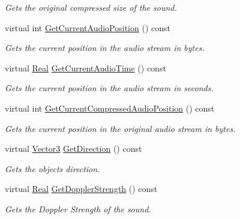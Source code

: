 \begin{DoxyCompactItemize}
\begin{DoxyCompactList}\small\item\em Gets the original compressed size of the sound. \item\end{DoxyCompactList}\item 
virtual int \hyperlink{classMezzanine_1_1Audio_1_1Sound_abba56b18b9bb7b65cc712b4093e87ab5}{GetCurrentAudioPosition} () const 
\begin{DoxyCompactList}\small\item\em Gets the current position in the audio stream in bytes. \item\end{DoxyCompactList}\item 
virtual \hyperlink{namespaceMezzanine_a726731b1a7df72bf3583e4a97282c6f6}{Real} \hyperlink{classMezzanine_1_1Audio_1_1Sound_ad5ddf0b36c1ca5222a12dd64fa38e0ae}{GetCurrentAudioTime} () const 
\begin{DoxyCompactList}\small\item\em Gets the current position in the audio stream in seconds. \item\end{DoxyCompactList}\item 
virtual int \hyperlink{classMezzanine_1_1Audio_1_1Sound_ad96c91677296147e532a84b53b39b6ee}{GetCurrentCompressedAudioPosition} () const 
\begin{DoxyCompactList}\small\item\em Gets the current position in the original audio stream in bytes. \item\end{DoxyCompactList}\item 
virtual \hyperlink{classMezzanine_1_1Vector3}{Vector3} \hyperlink{classMezzanine_1_1Audio_1_1Sound_a5a1152854f359c18e225511407489512}{GetDirection} () const 
\begin{DoxyCompactList}\small\item\em Gets the objects direction. \item\end{DoxyCompactList}\item 
virtual \hyperlink{namespaceMezzanine_a726731b1a7df72bf3583e4a97282c6f6}{Real} \hyperlink{classMezzanine_1_1Audio_1_1Sound_a3f6d586e0359db750b6976e360842a57}{GetDopplerStrength} () const 
\begin{DoxyCompactList}\small\item\em Gets the Doppler Strength of the sound. \item\end{DoxyCompactList}\item 

\end{DoxyCompactItemize}
